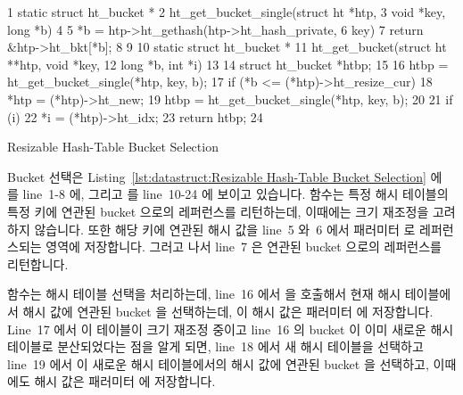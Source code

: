 \begin{listing}[tb]
{ \scriptsize
\begin{verbbox}
 1 static struct ht_bucket *
 2 ht_get_bucket_single(struct ht *htp,
 3                      void *key, long *b)
 4 {
 5   *b = htp->ht_gethash(htp->ht_hash_private,
 6                        key) %
 7   return &htp->ht_bkt[*b];
 8 }
 9 
10 static struct ht_bucket *
11 ht_get_bucket(struct ht **htp, void *key,
12               long *b, int *i)
13 {
14   struct ht_bucket *htbp;
15 
16   htbp = ht_get_bucket_single(*htp, key, b);
17   if (*b <= (*htp)->ht_resize_cur) {
18     *htp = (*htp)->ht_new;
19     htbp = ht_get_bucket_single(*htp, key, b);
20   }
21   if (i)
22     *i = (*htp)->ht_idx;
23   return htbp;
24 }
\end{verbbox}
}
\centering
\theverbbox
\caption{Resizable Hash-Table Bucket Selection}
\label{lst:datastruct:Resizable Hash-Table Bucket Selection}
\end{listing}

Bucket 선택은
Listing~\ref{lst:datastruct:Resizable Hash-Table Bucket Selection} 에
 를 line~1-8 에, 그리고
 를 line~10-24 에 보이고 있습니다.
 함수는 특정 해시 테이블의 특정 키에 연관된 bucket
으로의 레퍼런스를 리턴하는데, 이때에는 크기 재조정을 고려하지 않습니다.
또한 해당 키에 연관된 해시 값을 line~5 와~6 에서 패러미터  로
레퍼런스되는 영역에 저장합니다.
그러고 나서 line~7 은 연관된 bucket 으로의 레퍼런스를 리턴합니다.

 함수는 해시 테이블 선택을 처리하는데, line~16 에서
 을 호출해서 현재 해시 테이블에서 해시 값에 연관된
bucket 을 선택하는데, 이 해시 값은 패러미터  에 저장합니다.
Line~17 에서 이 테이블이 크기 재조정 중이고 line~16 의 bucket 이 이미 새로운
해시 테이블로 분산되었다는 점을 알게 되면, line~18 에서 새 해시 테이블을
선택하고 line~19 에서 이 새로운 해시 테이블에서의 해시 값에 연관된 bucket 을
선택하고, 이때에도 해시 값은 패러미터  에 저장합니다.
\iffalse

